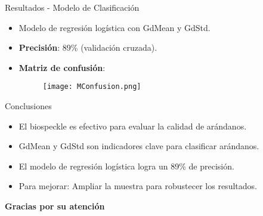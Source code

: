 \documentclass{beamer}
\begin{document}
\begin{frame}{Resultados - Modelo de Clasificación}
    \begin{itemize}
        \item Modelo de regresión logística con GdMean y GdStd.
        \item \textbf{Precisión}: 89\% (validación cruzada).
        \item \textbf{Matriz de confusión}:
        \begin{figure}
            \texttt{[image: MConfusion.png]}
        \end{figure}
    \end{itemize}
\end{frame}

\begin{frame}{Conclusiones}
    \begin{itemize}
        \item El biospeckle es efectivo para evaluar la calidad de arándanos.
        \item GdMean y GdStd son indicadores clave para clasificar arándanos.
        \item El modelo de regresión logística logra un 89\% de precisión.
        \item Para mejorar: Ampliar la muestra para robustecer los resultados.
    \end{itemize}
\end{frame}

\begin{frame}
    \centering
    \Huge{\textbf{Gracias por su atención}}
\end{frame}
\end{document}
